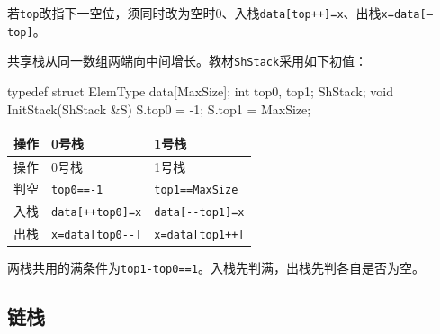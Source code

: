 若\texttt{top}改指下一空位，须同时改为空时0、入栈\texttt{data[\allowbreak{}top+\allowbreak{}+\allowbreak{}]\allowbreak{}=\allowbreak{}x}、出栈\texttt{x=\allowbreak{}data[\allowbreak{}--top]\allowbreak{}}。

共享栈从同一数组两端向中间增长。教材\texttt{ShStack}采用如下初值：

\par\smallskip\noindent\begin{minipage}{\linewidth}
\begin{codeblock}[language={C++}]
typedef struct {
    ElemType data[MaxSize];
    int top0, top1;
} ShStack;
void InitStack(ShStack &S) {
    S.top0 = -1;
    S.top1 = MaxSize;
}
\end{codeblock}
\end{minipage}\par\smallskip

\par\smallskip
{\fontsize{9.3}{12}\selectfont\setlength{\tabcolsep}{2.5pt}\setlength{\LTleft}{0pt}\setlength{\LTright}{0pt}
\begin{longtable}{@{}>{\raggedright\arraybackslash}p{}>{\raggedright\arraybackslash}p{}>{\raggedright\arraybackslash}p{}@{}}
\toprule
操作 & 0号栈 & 1号栈 \\

\midrule\endfirsthead\toprule
操作 & 0号栈 & 1号栈 \\

\midrule\endhead\bottomrule\endfoot
判空 & \texttt{top0==-1} & \texttt{top1==MaxSize} \\

入栈 & \texttt{data{[}++top0{]}=x} & \texttt{data{[}-\/-top1{]}=x} \\

出栈 & \texttt{x=data{[}top0-\/-{]}} & \texttt{x=data{[}top1++{]}} \\

\end{longtable}}
\par\smallskip

两栈共用的满条件为\texttt{top1-top0=\allowbreak{}=\allowbreak{}1}。入栈先判满，出栈先判各自是否为空。

\subsection{链栈}\label{DS03-linked-stack}

